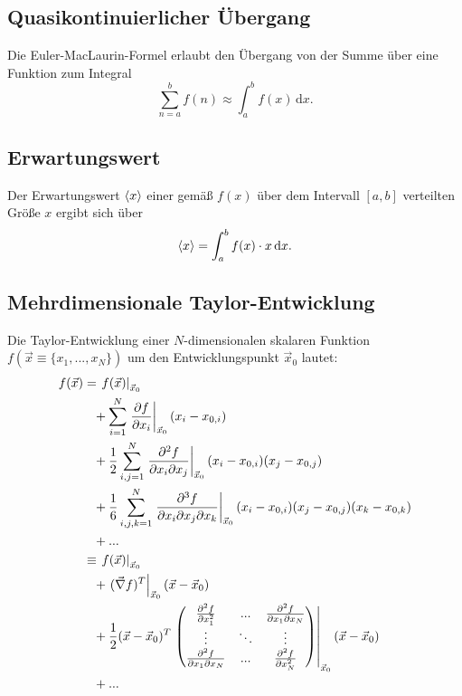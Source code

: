 \documentclass{article}
\newcommand{\diff}{\mathrm{d}}
\begin{document}
\newpage


\subsection{Quasikontinuierlicher Übergang}
Die Euler-MacLaurin-Formel erlaubt den Übergang von der Summe über eine Funktion zum Integral
	\begin{equation}
		\sum_{n=a}^b f(n) \approx \int_a^b f(x) \, \diff x.
	\end{equation}


\subsection{Erwartungswert}
Der Erwartungswert $\braket{x}$ einer gemäß $f(x)$ über dem Intervall $[a,b]$ verteilten Größe $x$ ergibt sich über
	\begin{equation}
		\braket{x} = \int_a^b f(x) \cdot x \, \diff x.
	\end{equation}


\subsection{Mehrdimensionale Taylor-Entwicklung}
Die Taylor-Entwicklung einer $N$-dimensionalen skalaren Funktion $f(\vec{x} \equiv \{x_1, ..., x_N\})$ um den Entwicklungspunkt $\vec{x}_0$ lautet:
	\begin{align}
		f(\vec{x}) &= \left. f(\vec{x}) \right|_{\vec{x}_0} \notag \\
		&\phantom{\equiv} +
		\sum_{i=1}^N \left. \frac{\partial f}{\partial x_i} \right|_{\vec{x}_0} (x_i - x_{0,i}) \notag \\
		&\phantom{\equiv} +
		\frac{1}{2}
		\sum_{i,j=1}^N \left. \frac{\partial^2 f}{\partial x_i \partial x_j} \right|_{\vec{x}_0} (x_i - x_{0,i}) (x_j - x_{0,j}) \notag \\
		&\phantom{\equiv} +
		\frac{1}{6}
		\sum_{i,j,k=1}^N \left. \frac{\partial^3 f}{\partial x_i \partial x_j \partial x_k} \right|_{\vec{x}_0} (x_i - x_{0,i}) (x_j - x_{0,j}) (x_k - x_{0,k}) \notag \\
		&\phantom{\equiv} + ... \\
		&\equiv
		\left. f(\vec{x}) \right|_{\vec{x}_0} \notag \\
		&\phantom{\equiv}
		+
		\left.
		(\vec{\nabla} f)^T
		\right|_{\vec{x}_0}
		(\vec{x} - \vec{x}_0) \notag \\
		&\phantom{\equiv}
		+
		\frac{1}{2}
		(\vec{x} - \vec{x}_0)^T
		\left.
		\begin{pmatrix}
			\frac{\partial^2 f}{\partial x_1^2} & ... & \frac{\partial^2 f}{\partial x_1 \partial x_N} \\
			\vdots & \ddots & \vdots \\
			\frac{\partial^2 f}{\partial x_1 \partial x_N} & ... & \frac{\partial^2 f}{\partial x_N^2}
		\end{pmatrix}
		\right|_{\vec{x}_0}
		(\vec{x} - \vec{x}_0) \notag \\
		&\phantom{\equiv}
		+ ...		
	\end{align}
\end{document}
